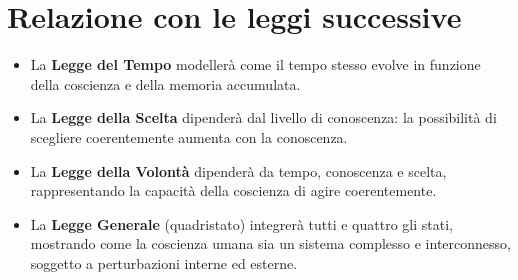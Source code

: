 \documentclass[12pt,a4paper]{article}
\begin{document}
\section{Relazione con le leggi successive}

\begin{itemize}
    \item La \textbf{Legge del Tempo} modellerà come il tempo stesso evolve in funzione della coscienza e della memoria accumulata.
    \item La \textbf{Legge della Scelta} dipenderà dal livello di conoscenza: la possibilità di scegliere coerentemente aumenta con la conoscenza.
    \item La \textbf{Legge della Volontà} dipenderà da tempo, conoscenza e scelta, rappresentando la capacità della coscienza di agire coerentemente.
    \item La \textbf{Legge Generale} (quadristato) integrerà tutti e quattro gli stati, mostrando come la coscienza umana sia un sistema complesso e interconnesso, soggetto a perturbazioni interne ed esterne.
\end{itemize}
\end{document}
